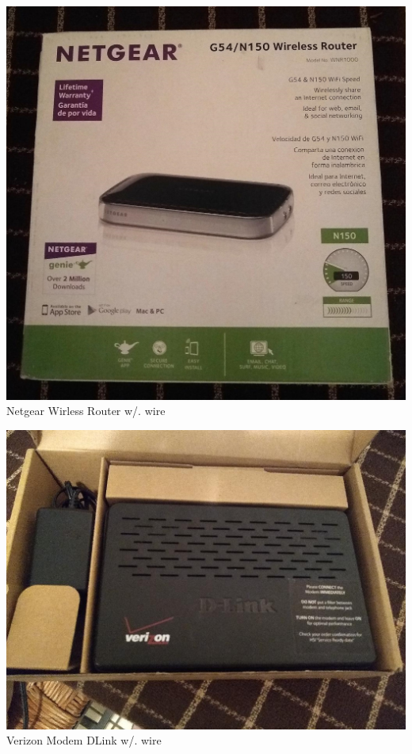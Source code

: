 \documentclass[t]{beamer}
\newcommand{\htarget}[2]{\hypertarget{#1}{#2}}
\begin{document}
\begin{frame}\htarget{netgear}{} \begin{center}
\includegraphics[height=0.8\textheight]{netgear_wireless_router_mini.jpg} \\
Netgear Wirless Router w/. wire
\end{center} \end{frame}
\begin{frame}\htarget{verizon}{} \begin{center}
\includegraphics[height=0.8\textheight]{verizon_modem01_mini.jpg} \\
Verizon Modem DLink w/. wire
\end{center} \end{frame}
\end{document}
